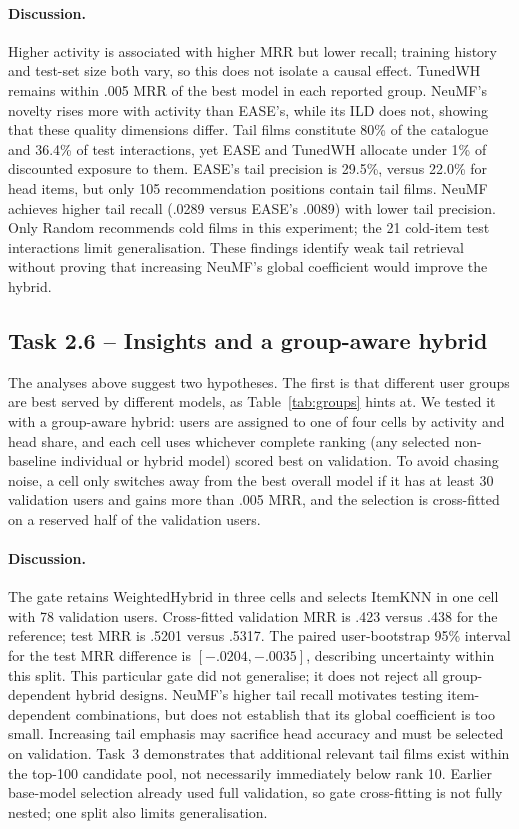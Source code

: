 \documentclass[12pt,a4paper]{article}   %
\begin{document}
\paragraph{Discussion.}
Higher activity is associated with higher MRR but lower
recall; training history and test-set size both vary, so
this does not isolate a causal effect. TunedWH remains
within .005 MRR of the best model in each reported group.
NeuMF's novelty rises more with activity than EASE's,
while its ILD does not, showing that these quality
dimensions differ. Tail films constitute 80\% of the
catalogue and 36.4\% of test interactions, yet EASE and
TunedWH allocate under 1\% of discounted exposure to them.
EASE's tail precision is 29.5\%, versus 22.0\% for head
items, but only 105 recommendation positions contain
tail films. NeuMF achieves higher tail recall (.0289
versus EASE's .0089) with lower tail precision.
Only Random recommends cold films in this experiment;
the 21 cold-item test interactions limit generalisation.
These findings identify weak tail retrieval without
proving that increasing NeuMF's global coefficient
would improve the hybrid.

\newpage
\subsection{Task 2.6 -- Insights and a group-aware hybrid}

The analyses above suggest two hypotheses. The first is that different user groups are best served by different models, as Table~\ref{tab:groups} hints at. We tested it with a group-aware hybrid: users are assigned to one of four cells by activity and head share, and each cell uses whichever complete ranking (any selected non-baseline individual or hybrid model) scored best on validation. To avoid chasing noise, a cell only switches away from the best overall model if it has at least 30 validation users and gains more than .005 MRR, and the selection is cross-fitted on a reserved half of the validation users.

\paragraph{Discussion.}
The gate retains WeightedHybrid in three cells and selects
ItemKNN in one cell with 78 validation users. Cross-fitted
validation MRR is .423 versus .438 for the reference;
test MRR is .5201 versus .5317. The paired user-bootstrap
95\% interval for the test MRR difference is
$[-.0204,-.0035]$, describing uncertainty within this split.
This particular gate did not generalise; it does not
reject all group-dependent hybrid designs. NeuMF's higher
tail recall motivates testing item-dependent combinations,
but does not establish that its global coefficient is
too small. Increasing tail emphasis may sacrifice head
accuracy and must be selected on validation. Task~3
demonstrates that additional relevant tail films exist
within the top-100 candidate pool, not necessarily
immediately below rank 10. Earlier base-model selection
already used full validation, so gate cross-fitting is
not fully nested; one split also limits generalisation.
\end{document}

